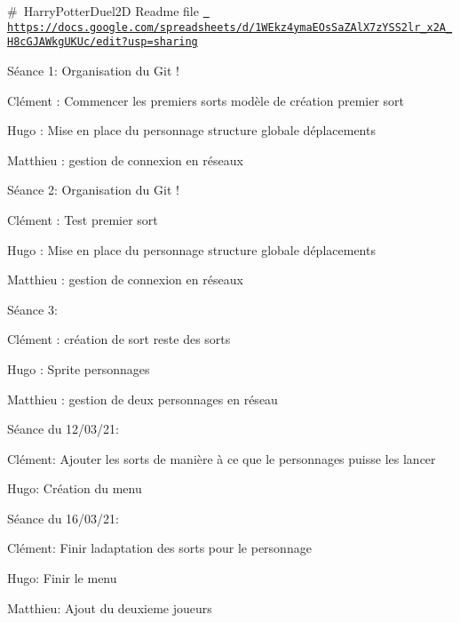 \#~Harry\+Potter\+Duel2D Readme file \href{https://docs.google.com/spreadsheets/d/1WEkz4ymaEOsSaZAlX7zYSS2lr_x2A_H8cGJAWkgUKUc/edit?usp=sharing}{\texttt{ https\+://docs.\+google.\+com/spreadsheets/d/1\+W\+Ekz4yma\+E\+Os\+Sa\+Z\+Al\+X7z\+Y\+S\+S2lr\+\_\+x2\+A\+\_\+\+H8c\+G\+J\+A\+Wkg\+U\+K\+Uc/edit?usp=sharing}}

Séance 1\+: Organisation du Git !

Clément \+: Commencer les premiers sorts modèle de création premier sort

Hugo \+: Mise en place du personnage structure globale déplacements

Matthieu \+: gestion de connexion en réseaux

Séance 2\+: Organisation du Git !

Clément \+: Test premier sort

Hugo \+: Mise en place du personnage structure globale déplacements

Matthieu \+: gestion de connexion en réseaux

Séance 3\+:

Clément \+: création de sort reste des sorts

Hugo \+: Sprite personnages

Matthieu \+: gestion de deux personnages en réseau

Séance du 12/03/21\+:

Clément\+: Ajouter les sorts de manière à ce que le personnages puisse les lancer

Hugo\+: Création du menu

Séance du 16/03/21\+:

Clément\+: Finir l\textquotesingle{}adaptation des sorts pour le personnage

Hugo\+: Finir le menu

Matthieu\+: Ajout du deuxieme joueurs 